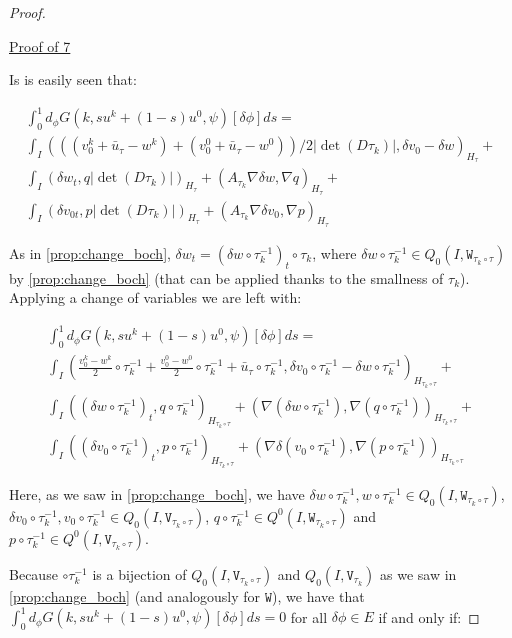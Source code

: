 \documentclass[english,a4paper,9pt,oneside]{scrbook}	%
\theoremstyle{break}
\newenvironment{mproof}[1][\proofname]{%
  \begin{proof}[#1]$ $\par\nobreak\ignorespaces
}{%
  \end{proof}
}
\renewcommand*{\proofname}{Proof}
\theoremstyle{remark}
\newcommand{\tw}[1]{\texttt{#1}}
\begin{document}
\begin{mproof}
\underline{Proof of 7}

Is is easily seen that:

\begin{align*}
\int_0^1d_\phi G(k, su^k + (1-s)u^0,\psi)[\delta \phi]ds = \\
\int_I (((v_0^k+\bar{u}_\tau - w^k)+(v_0^0+\bar{u}_\tau - w^0))/2|\det(D\tau_k)|,\delta v_0-\delta w)_{H_\tau}+\\
\int_I ( \delta w_t , q |\det(D\tau_k)|)_{H_\tau}+ (A_{\tau_k}\nabla \delta w, \nabla q)_{H_\tau}+\\
\int_I ( \delta v_{0t},p |\det(D\tau_k)|)_{H_\tau} + (A_{\tau_k} \nabla \delta v_0, \nabla p)_{H_\tau}
\end{align*}

As in \cref{prop:change_boch}, $ \delta w_t  = (\delta w\circ \tau_k^{-1})_t\circ \tau_k$, where $\delta w\circ \tau_k^{-1} \in Q_0(I,\tw{W}_{\tau_k \circ \tau})$ by \cref{prop:change_boch} (that can be applied thanks to the smallness of $\tau_k$).
Applying a change of variables we are left with:

\begin{align*}
\int_0^1 d_\phi G(k, su^k + (1-s)u^0,\psi)[\delta \phi]ds = \\
\int_I \left (\frac{v_0^k-w^k}{2}\circ \tau_k^{-1}+ \frac{v_0^0-w^0}{2}\circ \tau_k^{-1}+\bar{u}_\tau\circ \tau_k^{-1} ,\delta v_0\circ \tau_k^{-1}-\delta w\circ \tau_k^{-1}\right)_{H_{\tau_k \circ \tau}}+\\
\int_I ((\delta w\circ \tau_k^{-1})_t , q\circ \tau_k^{-1} )_{H_{\tau_k \circ \tau}}+ (\nabla (\delta w\circ \tau_k^{-1}), \nabla( q\circ \tau_k^{-1}))_{H_{\tau_k \circ \tau}}+\\
\int_I ( (\delta v_{0}\circ \tau_k^{-1})_t,p \circ \tau_k^{-1})_{H_{\tau_k \circ \tau}} + ( \nabla \delta (v_0\circ \tau_k^{-1}), \nabla (p\circ \tau_k^{-1}))_{H_{\tau_k \circ \tau}}
\end{align*}

Here, as we saw in \cref{prop:change_boch}, we have $\delta w\circ \tau_k^{-1}, w\circ \tau_k^{-1} \in Q_0(I, \tw{W}_{\tau_k \circ \tau})$, $ \delta v_{0}\circ \tau_k^{-1}, v_{0}\circ \tau_k^{-1} \in Q_0(I,\tw{V}_{\tau_k \circ \tau})$, $q\circ \tau_k^{-1}\in Q^0(I, \tw{W}_{\tau_k \circ \tau})$ and $p\circ \tau_k^{-1}\in Q^0(I, \tw{V}_{\tau_k \circ \tau})$.

Because $\circ \tau_k^{-1}$ is a bijection of $Q_0(I,\tw{V}_{\tau_k \circ \tau})$ and $Q_0(I,\tw{V}_{\tau_k})$ as we saw in \cref{prop:change_boch} (and analogously for $\tw{W}$), we have that  $\int_0^1 d_\phi G(k, su^k + (1-s)u^0,\psi)[\delta \phi]ds=0$ for all $\delta \phi \in E$ if and only if:


\end{mproof}
\end{document}
